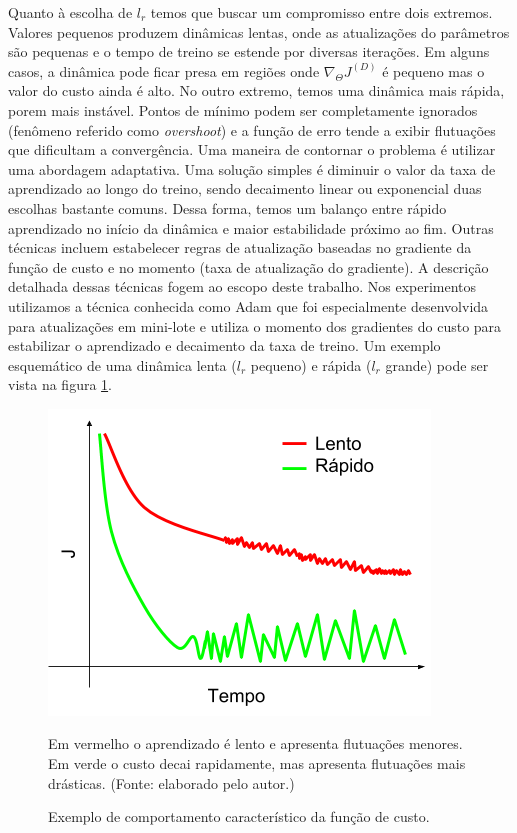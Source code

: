 Quanto à escolha de $l_r$ temos que buscar um compromisso entre dois extremos. Valores pequenos produzem dinâmicas lentas, onde as atualizações do parâmetros são pequenas e o tempo de treino se estende por diversas iterações. Em alguns casos, a dinâmica pode ficar presa em regiões onde $\nabla_{\Theta} J^{(D)}$ é pequeno mas o valor do custo ainda é alto. No outro extremo, temos uma dinâmica mais rápida, porem mais instável. Pontos de mínimo podem ser completamente ignorados (fenômeno referido como \textit{overshoot}) e a função de erro tende a exibir flutuações que dificultam a convergência. Uma maneira de contornar o problema é utilizar uma abordagem adaptativa. Uma solução simples é diminuir o valor da taxa de aprendizado ao longo do treino, sendo decaimento linear ou exponencial duas escolhas bastante comuns. Dessa forma, temos um balanço entre rápido aprendizado no início da dinâmica e maior estabilidade próximo ao fim. Outras técnicas incluem estabelecer regras de atualização baseadas no gradiente da função de custo e no momento (taxa de atualização do gradiente). A descrição detalhada dessas técnicas fogem ao escopo deste trabalho. Nos experimentos utilizamos a técnica conhecida como Adam \cite{adam_op} que foi especialmente desenvolvida para atualizações em mini-lote e utiliza o momento dos gradientes do custo para estabilizar o aprendizado e decaimento da taxa de treino. Um exemplo esquemático de uma dinâmica lenta ($l_r$ pequeno) e rápida ($l_r$ grande) pode ser vista na figura \ref{convergence}.

\begin{figure}[ht]
	\caption{Exemplo de comportamento característico da função de custo.}
	\begin{center}
	\includegraphics[width=.6\linewidth]{figuras/convergence.png}
	\end{center}
	\small Em vermelho o aprendizado é lento e apresenta flutuações menores. Em verde o custo decai rapidamente, mas apresenta flutuações mais drásticas. (Fonte: elaborado pelo autor.)
	\label{convergence}
\end{figure}


